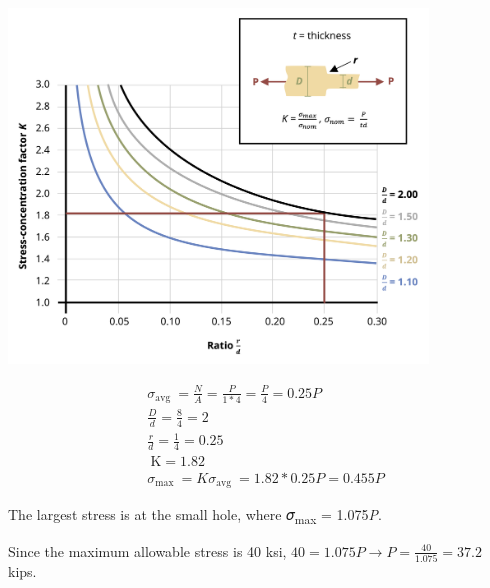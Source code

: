 \documentclass[
  letterpaper,
  DIV=11,
  numbers=noendperiod]{scrreprt}
\begin{document}
\begin{tcolorbox}
\begin{tcolorbox}
\begin{center}
\includegraphics[width=4.38542in,height=\textheight]{images/PNGs/Example 5.2 part 4.png}
\end{center}

\[
\begin{aligned}
& \sigma_{\text {avg }}=\frac{N}{A}=\frac{P}{1 * 4}=\frac{P}{4}=0.25 P \\
& \frac{D}{d}=\frac{8}{4}=2 \\
& \frac{r}{d}=\frac{1}{4}=0.25 \\
& \mathrm{~K}=1.82 \\
& \sigma_{\text {max }}=K \sigma_{\text {avg }}=1.82 * 0.25 P=0.455 P
\end{aligned}
\]

The largest stress is at the small hole, where 𝜎\textsubscript{max} =
1.075\emph{P}.

Since the maximum allowable stress is 40 ksi,
\(40=1.075 P \rightarrow P=\frac{40}{1.075}=37.2\) kips.

\end{tcolorbox}

\end{tcolorbox}
\end{document}
